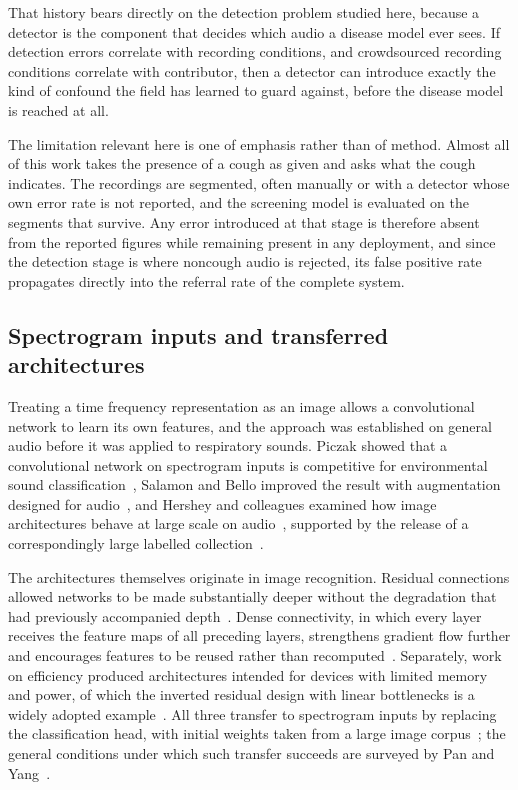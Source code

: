 \documentclass[pdflatex,sn-mathphys-num]{sn-jnl}
\begin{document}
That history bears directly on the detection problem studied here, because a
detector is the component that decides which audio a disease model ever sees.
If detection errors correlate with recording conditions, and crowdsourced
recording conditions correlate with contributor, then a detector can
introduce exactly the kind of confound the field has learned to guard
against, before the disease model is reached at all.

The limitation relevant here is one of emphasis rather than of method. Almost
all of this work takes the presence of a cough as given and asks what the
cough indicates. The recordings are segmented, often manually or with a
detector whose own error rate is not reported, and the screening model is
evaluated on the segments that survive. Any error introduced at that stage is
therefore absent from the reported figures while remaining present in any
deployment, and since the detection stage is where noncough audio is rejected,
its false positive rate propagates directly into the referral rate of the
complete system.

\subsection{Spectrogram inputs and transferred architectures}\label{sec:rel-transfer}

Treating a time frequency representation as an image allows a convolutional
network to learn its own features, and the approach was established on general
audio before it was applied to respiratory sounds. Piczak showed that a
convolutional network on spectrogram inputs is competitive for environmental
sound classification~\cite{piczak2015}, Salamon and Bello improved the result
with augmentation designed for audio~\cite{salamon2017}, and Hershey and
colleagues examined how image architectures behave at large scale on
audio~\cite{hershey2017}, supported by the release of a correspondingly large
labelled collection~\cite{gemmeke2017}.

The architectures themselves originate in image recognition. Residual
connections allowed networks to be made substantially deeper without the
degradation that had previously accompanied depth~\cite{he2016}. Dense
connectivity, in which every layer receives the feature maps of all preceding
layers, strengthens gradient flow further and encourages features to be reused
rather than recomputed~\cite{huang2017}. Separately, work on efficiency
produced architectures intended for devices with limited memory and power, of
which the inverted residual design with linear bottlenecks is a widely adopted
example~\cite{sandler2018}. All three transfer to spectrogram inputs by
replacing the classification head, with initial weights taken from a large
image corpus~\cite{deng2009}; the general conditions under which such transfer
succeeds are surveyed by Pan and Yang~\cite{pan2010}.
\end{document}
